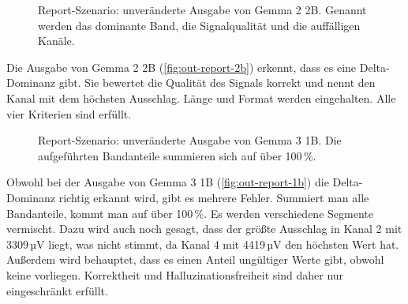 \begin{figure}[H]
\centering
{\setlength{\fboxsep}{8pt}%
}
\caption[Ausgabe von Gemma 2 2B]{Report-Szenario: unveränderte Ausgabe von Gemma 2 2B. Genannt werden das dominante Band, die Signalqualität und die auffälligen Kanäle.}
\label{fig:out-report-2b}
\end{figure}

\noindent Die Ausgabe von Gemma 2 2B (\autoref{fig:out-report-2b}) erkennt, dass es eine Delta-Dominanz gibt. Sie bewertet die Qualität des Signals korrekt und nennt den Kanal mit dem höchsten Ausschlag. Länge und Format werden eingehalten. Alle vier Kriterien sind erfüllt.

\begin{figure}[H]
\centering
{\setlength{\fboxsep}{8pt}%
}
\caption[Ausgabe von Gemma 3 1B]{Report-Szenario: unveränderte Ausgabe von Gemma 3 1B. Die aufgeführten Bandanteile summieren sich auf über 100\,\%.}
\label{fig:out-report-1b}
\end{figure}

\noindent Obwohl bei der Ausgabe von Gemma 3 1B (\autoref{fig:out-report-1b}) die Delta-Dominanz richtig erkannt wird, gibt es mehrere Fehler. Summiert man alle Bandanteile, kommt man auf über 100\,\%. Es werden verschiedene Segmente vermischt. Dazu wird auch noch gesagt, dass der größte Ausschlag in Kanal 2 mit 3309\,µV liegt, was nicht stimmt, da Kanal 4 mit 4419\,µV den höchsten Wert hat. Außerdem wird behauptet, dass es einen Anteil ungültiger Werte gibt, obwohl keine vorliegen. Korrektheit und Halluzinationsfreiheit sind daher nur eingeschränkt erfüllt.

